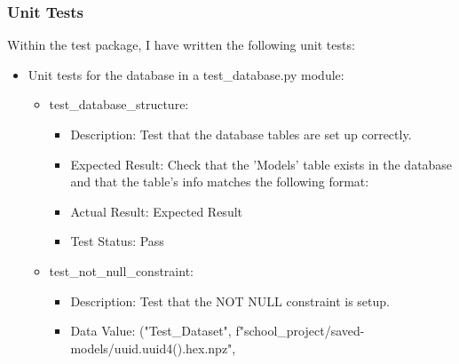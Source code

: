 \documentclass[./project-report/src/latex/project-report.tex]{subfiles}
\begin{document}
\subsubsection{Unit Tests}

Within the test package, I have written the following unit tests:

\begin{itemize}
    \label{sec:database-unit-tests}
    \item Unit tests for the database in a test\_database.py module:
        \begin{itemize}
            \item test\_database\_structure:
            \begin{itemize}
                \item Description: Test that the database tables are set up correctly.
                \item Expected Result: Check that the 'Models' table exists in the database and that the table's info matches the following format: 
                \item Actual Result: Expected Result
                \item Test Status: Pass
            \end{itemize}
			\item test\_not\_null\_constraint:
			\begin{itemize}
				\item Description: Test that the NOT NULL constraint is setup.
				\item Data Value: \newline
					 ("Test\_Dataset", \newline
                     f"school\_project/saved-models/{uuid.uuid4().hex}.npz", \newline

\end{itemize}
\end{itemize}
\end{itemize}
\end{document}
